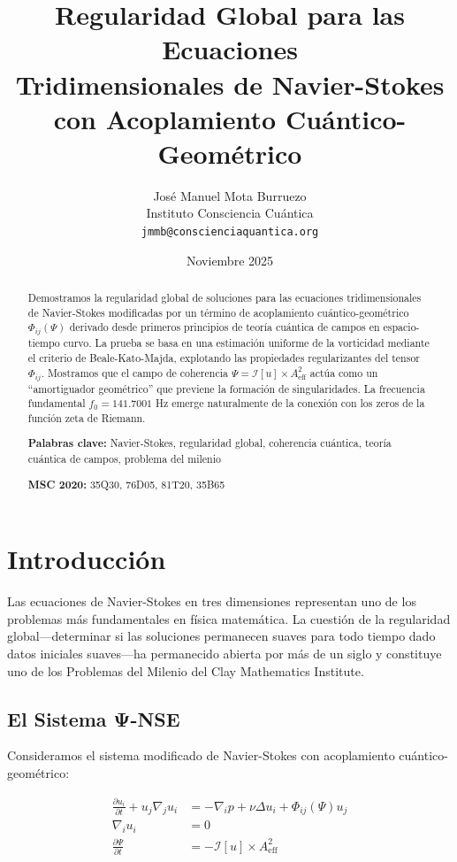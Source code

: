 \documentclass[12pt,a4paper]{article}
\title{\textbf{Regularidad Global para las Ecuaciones \\
       Tridimensionales de Navier-Stokes \\
       con Acoplamiento Cuántico-Geométrico}}
\author{José Manuel Mota Burruezo \\
        Instituto Consciencia Cuántica \\
        \texttt{jmmb@conscienciaquantica.org}}
\date{Noviembre 2025}
\theoremstyle{definition}
\theoremstyle{remark}
\begin{document}
\maketitle

\begin{abstract}
Demostramos la regularidad global de soluciones para las ecuaciones tridimensionales 
de Navier-Stokes modificadas por un término de acoplamiento cuántico-geométrico 
$\Phi_{ij}(\Psi)$ derivado desde primeros principios de teoría cuántica de campos 
en espacio-tiempo curvo. La prueba se basa en una estimación uniforme de la 
vorticidad mediante el criterio de Beale-Kato-Majda, explotando las propiedades 
regularizantes del tensor $\Phi_{ij}$. Mostramos que el campo de coherencia 
$\Psi = \mathcal{I}[u] \times A_{\text{eff}}^2$ actúa como un ``amortiguador 
geométrico'' que previene la formación de singularidades. La frecuencia fundamental 
$f_0 = 141.7001$ Hz emerge naturalmente de la conexión con los zeros de la función 
zeta de Riemann.

\noindent \textbf{Palabras clave:} Navier-Stokes, regularidad global, coherencia 
cuántica, teoría cuántica de campos, problema del milenio

\noindent \textbf{MSC 2020:} 35Q30, 76D05, 81T20, 35B65
\end{abstract}

\tableofcontents
\newpage



\section{Introducción}

Las ecuaciones de Navier-Stokes en tres dimensiones representan uno de los problemas 
más fundamentales en física matemática. La cuestión de la regularidad global—determinar 
si las soluciones permanecen suaves para todo tiempo dado datos iniciales suaves—ha 
permanecido abierta por más de un siglo y constituye uno de los Problemas del Milenio 
del Clay Mathematics Institute.

\subsection{El Sistema Ψ-NSE}

Consideramos el sistema modificado de Navier-Stokes con acoplamiento cuántico-geométrico:

\begin{equation}
\begin{aligned}
\frac{\partial u_i}{\partial t} + u_j \nabla_j u_i &= -\nabla_i p + \nu \Delta u_i + \Phi_{ij}(\Psi) u_j \\
\nabla_i u_i &= 0 \\
\frac{\partial \Psi}{\partial t} &= -\mathcal{I}[u] \times A_{\text{eff}}^2
\end{aligned}
\end{equation}
\end{document}
